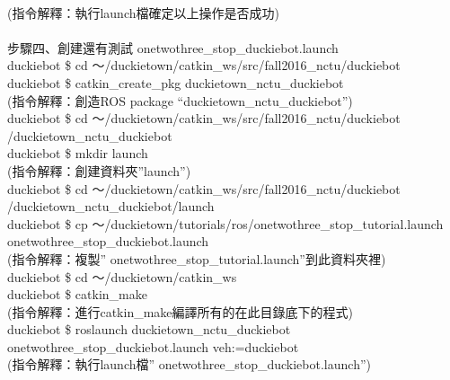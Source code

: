\documentclass{article}
\begin{document}
\\(指令解釋：執行launch檔確定以上操作是否成功)
\\\\步驟四、創建還有測試 onetwothree\_stop\_duckiebot.launch	
\\duckiebot \$ cd ～/duckietown/catkin\_ws/src/fall2016\_nctu/duckiebot
\\duckiebot \$ catkin\_create\_pkg duckietown\_nctu\_duckiebot
\\(指令解釋：創造ROS package “duckietown\_nctu\_duckiebot”)
\\duckiebot \$ cd ～/duckietown/catkin\_ws/src/fall2016\_nctu/duckiebot /duckietown\_nctu\_duckiebot
\\duckiebot \$ mkdir launch
\\(指令解釋：創建資料夾”launch”)
\\duckiebot \$ cd ～/duckietown/catkin\_ws/src/fall2016\_nctu/duckiebot /duckietown\_nctu\_duckiebot/launch
\\duckiebot \$ cp ～/duckietown/tutorials/ros/onetwothree\_stop\_tutorial.launch onetwothree\_stop\_duckiebot.launch
\\(指令解釋：複製” onetwothree\_stop\_tutorial.launch”到此資料夾裡)
\\duckiebot \$ cd ～/duckietown/catkin\_ws
\\duckiebot \$ catkin\_make
\\(指令解釋：進行catkin\_make編譯所有的在此目錄底下的程式)
\\duckiebot \$ roslaunch duckietown\_nctu\_duckiebot onetwothree\_stop\_duckiebot.launch veh:=duckiebot
\\(指令解釋：執行launch檔” onetwothree\_stop\_duckiebot.launch”)
\end{document}
